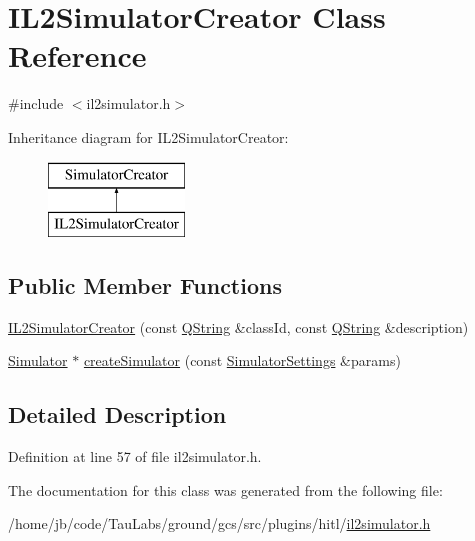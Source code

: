 \hypertarget{class_i_l2_simulator_creator}{\section{\-I\-L2\-Simulator\-Creator \-Class \-Reference}
\label{class_i_l2_simulator_creator}
}


{\ttfamily \#include $<$il2simulator.\-h$>$}

\-Inheritance diagram for \-I\-L2\-Simulator\-Creator\-:\begin{figure}[H]
\begin{center}
\leavevmode
\includegraphics[height=2.000000cm]{class_i_l2_simulator_creator}
\end{center}
\end{figure}
\subsection*{\-Public \-Member \-Functions}
\begin{DoxyCompactItemize}
\item 
\hyperlink{group___h_i_t_l_plugin_ga48d82430e3d3b6b0cc8fb1ed921a5ad0}{\-I\-L2\-Simulator\-Creator} (const \hyperlink{group___u_a_v_objects_plugin_gab9d252f49c333c94a72f97ce3105a32d}{\-Q\-String} \&class\-Id, const \hyperlink{group___u_a_v_objects_plugin_gab9d252f49c333c94a72f97ce3105a32d}{\-Q\-String} \&description)
\item 
\hyperlink{class_simulator}{\-Simulator} $\ast$ \hyperlink{group___h_i_t_l_plugin_gaea21540d2b8699f845b5a6969e5254ba}{create\-Simulator} (const \hyperlink{group___h_i_t_l_plugin_ga052199f1328d3002bce3e45345aa7f4e}{\-Simulator\-Settings} \&params)
\end{DoxyCompactItemize}


\subsection{\-Detailed \-Description}


\-Definition at line 57 of file il2simulator.\-h.



\-The documentation for this class was generated from the following file\-:\begin{DoxyCompactItemize}
\item 
/home/jb/code/\-Tau\-Labs/ground/gcs/src/plugins/hitl/\hyperlink{il2simulator_8h}{il2simulator.\-h}\end{DoxyCompactItemize}
